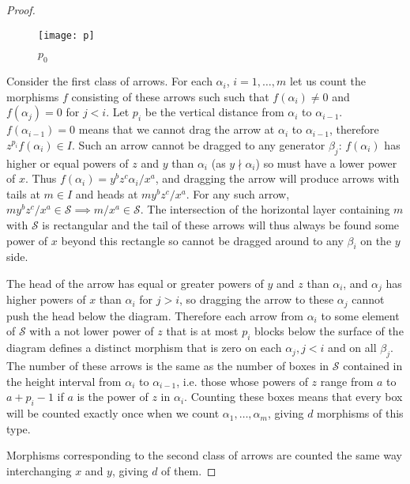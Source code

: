 \documentclass[a4page]{article}
\theoremstyle{definition}
\def\S{\mathcal{S}}
\begin{document}
\begin{proof}
\begin{figure}
\centering
\texttt{[image: p]}
\caption{$p_0$}
\label{fig:p}
\end{figure}

Consider the first class of arrows.
For each $\alpha_i$, $i=1, \dots, m$ let us count the morphisms $f$ consisting of these arrows such such that $f(\alpha_i) \neq 0$ and $f(\alpha_j)=0$ for $j<i$.
Let $p_i$ be the vertical distance from $\alpha_i$ to $\alpha_{i-1}$. %
$f(\alpha_{i-1})=0$ means that we cannot drag the arrow at $\alpha_i$ to $\alpha_{i-1}$,
therefore $z^{p_i}f(\alpha_i) \in I$.
Such an arrow cannot be dragged to any generator $\beta_j$: 
$f(\alpha_i)$ has higher or equal powers of $z$ and $y$ than $\alpha_i$ (as $y \nmid \alpha_i$) so must have a lower power of $x$.
Thus $f(\alpha_i)=y^bz^c\alpha_i/x^a$,
and dragging the arrow will produce arrows with tails at $m \in I$ and heads at $my^bz^c/x^a$.
For any such arrow, $my^bz^c/x^a \in \S \implies m/x^a \in \S$.
The intersection of the horizontal layer containing $m$ with $\S$ is rectangular and the tail of these arrows will thus always be found some power of $x$ beyond this rectangle
so cannot be dragged around to any $\beta_i$ on the $y$ side.

The head of the arrow has equal or greater powers of $y$ and $z$ than $\alpha_i$, and $\alpha_j$ has higher powers of $x$ than $\alpha_i$ for $j>i$,
so dragging the arrow to these $\alpha_j$ cannot push the head below the diagram.
Therefore each arrow from $\alpha_i$ to some element of $\S$ with a not lower power of $z$ that is at most $p_i$ blocks below the surface of the diagram
defines a distinct morphism that is zero on each $\alpha_j, j<i$ and on all $\beta_j$.
The number of these arrows is the same as the number of boxes in $\S$ contained in the height interval from $\alpha_i$ to $\alpha_{i-1}$,
i.e.
those whose powers of $z$ range from $a$ to $a+p_i-1$ if $a$ is the power of $z$ in $\alpha_i$.
Counting these boxes means that every box will be counted exactly once when we count $\alpha_1, \dots, \alpha_m$, giving $d$ morphisms of this type.

Morphisms corresponding to the second class of arrows are counted the same way interchanging $x$ and $y$, giving $d$ of them.


\end{proof}
\end{document}
